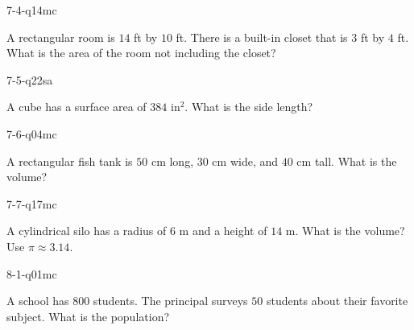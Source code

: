 \begin{practiceQuestion}{7-4-q14}{mc}
\begin{questionText}
A rectangular room is $14$ ft by $10$ ft. There is a built-in closet that is $3$ ft by $4$ ft. What is the area of the room not including the closet?
\end{questionText}
\end{practiceQuestion}

\begin{practiceQuestion}{7-5-q22}{sa}
\begin{questionText}
A cube has a surface area of $384$ in$^2$. What is the side length?
\end{questionText}
\end{practiceQuestion}

\begin{practiceQuestion}{7-6-q04}{mc}
\begin{questionText}
A rectangular fish tank is $50$ cm long, $30$ cm wide, and $40$ cm tall. What is the volume?
\end{questionText}
\end{practiceQuestion}

\begin{practiceQuestion}{7-7-q17}{mc}
\begin{questionText}
A cylindrical silo has a radius of $6$ m and a height of $14$ m. What is the volume? Use $\pi \approx 3.14$.
\end{questionText}
\end{practiceQuestion}

\begin{practiceQuestion}{8-1-q01}{mc}
\begin{questionText}
A school has $800$ students. The principal surveys $50$ students about their favorite subject. What is the population?
\end{questionText}
\end{practiceQuestion}

